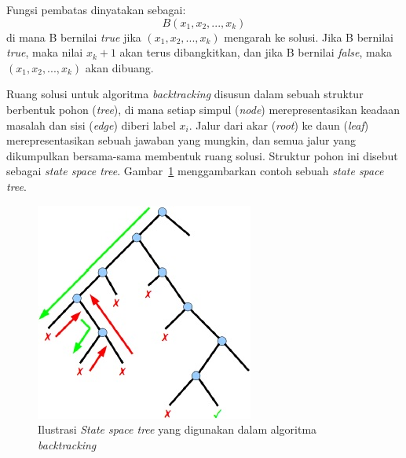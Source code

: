 \begin{enumerate}
Fungsi pembatas dinyatakan sebagai:
\begin{displaymath}
B(x_1, x_2, ..., x_k)
\end{displaymath}
di mana B bernilai \textit{true} jika \begin{math}(x_1, x_2, ..., x_k)\end{math} mengarah ke solusi. Jika B bernilai \textit{true}, maka nilai \begin{math}x_k+1\end{math} akan terus dibangkitkan, dan jika B bernilai \textit{false}, maka \begin{math}(x_1, x_2, ..., x_k)\end{math} akan dibuang.
\end{enumerate}

Ruang solusi untuk algoritma \textit{backtracking} disusun dalam sebuah struktur berbentuk pohon (\textit{tree}), di mana setiap simpul (\textit{node}) merepresentasikan keadaan masalah dan sisi (\textit{edge}) diberi label \begin{math}x_i\end{math}. Jalur dari akar (\textit{root}) ke daun (\textit{leaf}) merepresentasikan sebuah jawaban yang mungkin, dan semua jalur yang dikumpulkan bersama-sama membentuk ruang solusi. Struktur pohon ini disebut sebagai \textit{state space tree}. Gambar~\ref{fig:backtracking3} menggambarkan contoh sebuah \textit{state space tree}.

\begin{figure}
\centering
\captionsetup{justification=centering}
\includegraphics[scale=1]{Gambar/Backtracking3}
\caption[Ilustrasi \textit{State space tree} yang digunakan dalam algoritma \textit{backtracking} ~\cite{fahda:16:backtracking}]{Ilustrasi \textit{State space tree} yang digunakan dalam algoritma \textit{backtracking} ~\cite{fahda:16:backtracking}}
\label{fig:backtracking3}
\end{figure}

